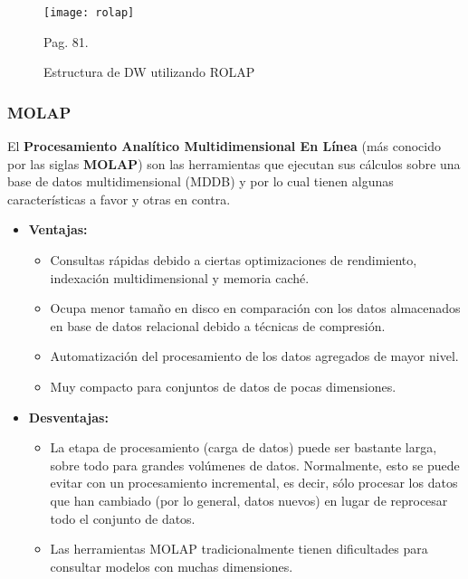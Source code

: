 \documentclass[a4paper,11pt]{article}
\begin{document}
\begin{flushleft}
    \begin{figure}
      \begin{center}
        \texttt{[image: rolap]}
        \caption{Estructura de DW utilizando ROLAP} \cite{nagabhushana} Pag. 81.
        \label{rolap}
      \end{center}
    \end{figure}
    
    \subsubsection{MOLAP}
    
    El \textbf{Procesamiento Analítico Multidimensional En Línea} (más conocido por las siglas \textbf{MOLAP}) son las herramientas que ejecutan sus
    cálculos sobre una base de datos multidimensional (MDDB) y por lo cual tienen algunas características a favor y otras en contra.
    
    \begin{itemize}
      \item \textbf{Ventajas:}
        \begin{itemize}
          \item Consultas rápidas debido a ciertas optimizaciones de rendimiento, indexación multidimensional y memoria caché.
          \item Ocupa menor tamaño en disco en comparación con los datos almacenados en base de datos relacional debido a técnicas de compresión.
          \item Automatización del procesamiento de los datos agregados de mayor nivel.
          \item Muy compacto para conjuntos de datos de pocas dimensiones.
        \end{itemize}
      \item \textbf{Desventajas:}
        \begin{itemize}
          \item La etapa de procesamiento (carga de datos) puede ser bastante larga, sobre todo para grandes volúmenes de datos. Normalmente, esto se
          puede evitar con un procesamiento incremental, es decir, sólo procesar los datos que han cambiado (por lo general, datos nuevos) en lugar de
          reprocesar todo el conjunto de datos.
          \item Las herramientas MOLAP tradicionalmente tienen dificultades para consultar modelos con muchas dimensiones.
        \end{itemize}
    \end{itemize} 
    

\end{flushleft}
\end{document}
